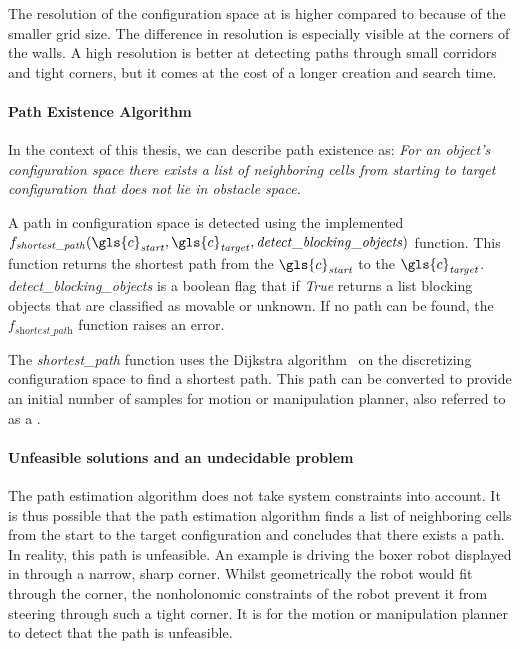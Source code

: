 The resolution of the configuration space at  is higher compared to  because of the smaller grid size. The difference in resolution is especially visible at the corners of the walls. A high resolution is better at detecting paths through small corridors and tight corners, but it comes at the cost of a longer creation and search time.

\paragraph{Path Existence Algorithm} In the context of this thesis, we can describe path existence as: \textit{For an object's configuration space there exists a list of neighboring cells from starting to target configuration that does not lie in obstacle space.\bs}

A path in configuration space is detected using the implemented\\$f_\mathit{shortest\_path}(\gls{c}_\mathit{start}, \gls{c}_\mathit{target}, \mathit{detect\_blocking\_objects})$ function. This function returns the shortest path from the $\gls{c}_\mathit{start}$ to the $\gls{c}_\mathit{target}$. \textit{detect\_blocking\_objects} is a boolean flag that if \textit{True} returns a list blocking objects that are classified as movable or unknown. If no path can be found, the $f_\textit{shortest\_path}$ function raises an error.\bs

The \textit{shortest\_path} function uses the Dijkstra algorithm~\cite{dijkstra_note_1959} on the discretizing configuration space to find a shortest path. This path can be converted to provide an initial number of samples for motion or manipulation planner, also referred to as a .\bs

\paragraph{Unfeasible solutions and an undecidable problem}
The path estimation algorithm does not take system constraints into account. It is thus possible that the path estimation algorithm finds a list of neighboring cells from the start to the target configuration and concludes that there exists a path. In reality, this path is unfeasible. An example is driving the boxer robot displayed in  through a narrow, sharp corner. Whilst geometrically the robot would fit through the corner, the nonholonomic constraints of the robot prevent it from steering through such a tight corner. It is for the motion or manipulation planner to detect that the path is unfeasible.\\

